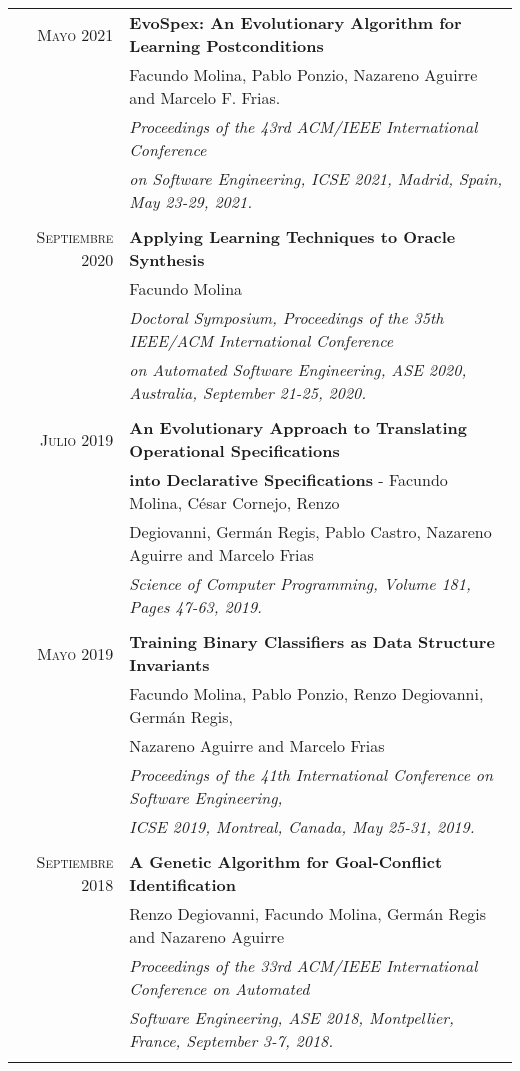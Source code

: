 \documentclass[a4paper,10pt]{article} %
\begin{document}
\begin{longtable}{rl}
\textsc{Mayo} 2021  & \textbf{EvoSpex: An Evolutionary Algorithm for Learning Postconditions} \\
& Facundo Molina, Pablo Ponzio, Nazareno Aguirre and Marcelo F. Frias. \\
& \textit{Proceedings of the 43rd ACM/IEEE International Conference} \\
& \textit{on Software Engineering, ICSE 2021, Madrid, Spain, May 23-29, 2021.} \\ & \\

\textsc{Septiembre} 2020  & \textbf{Applying Learning Techniques to Oracle Synthesis} \\
& Facundo Molina \\
& \textit{Doctoral Symposium, Proceedings of the 35th IEEE/ACM International Conference} \\
& \textit{on Automated Software Engineering, ASE 2020, Australia, September 21-25, 2020.} \\ & \\

\textsc{Julio} 2019  & \textbf{An Evolutionary Approach to Translating Operational Specifications} \\ & \textbf{into Declarative Specifications} - Facundo Molina, César Cornejo, Renzo\\ 
& Degiovanni, Germán Regis, Pablo Castro, Nazareno Aguirre and Marcelo Frias \\
& \textit{Science of Computer Programming, Volume 181, Pages 47-63, 2019.} \\ & \\

\textsc{Mayo} 2019  & \textbf{Training Binary Classifiers as Data Structure Invariants} \\ 
& Facundo Molina, Pablo Ponzio, Renzo Degiovanni, Germán Regis, \\ 
& Nazareno Aguirre and Marcelo Frias \\
& \textit{Proceedings of the 41th International Conference on Software Engineering,} \\
& \textit{ICSE 2019, Montreal, Canada, May 25-31, 2019.} \\ & \\

\textsc{Septiembre} 2018  & \textbf{A Genetic Algorithm for Goal-Conflict Identification} \\ 
& Renzo Degiovanni, Facundo Molina, Germán Regis and Nazareno Aguirre \\
& \textit{Proceedings of the 33rd ACM/IEEE International Conference on Automated } \\
& \textit{Software Engineering, ASE 2018, Montpellier, France, September 3-7, 2018.} \\ & \\


\end{longtable}
\end{document}
